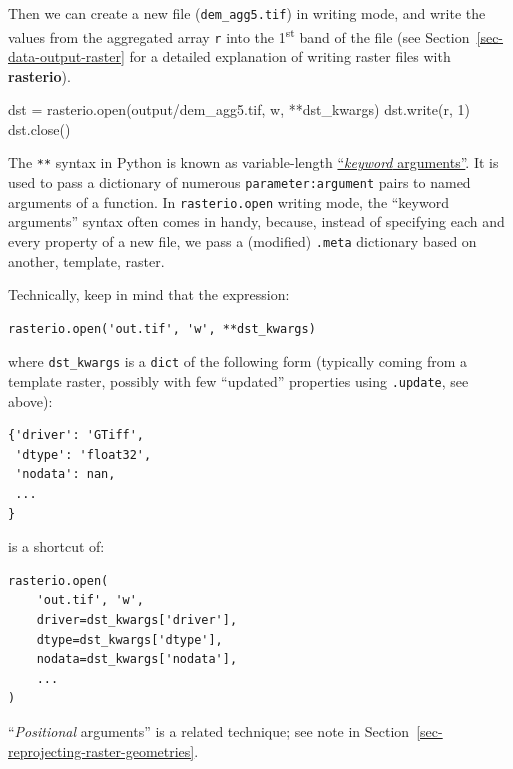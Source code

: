 \documentclass[
  letterpaper,
]{krantz}
\newenvironment{Shaded}{\begin{snugshade}}{\end{snugshade}}
\newcommand{\BuiltInTok}[1]{\textcolor[rgb]{0.00,0.23,0.31}{#1}}
\newcommand{\DecValTok}[1]{\textcolor[rgb]{0.68,0.00,0.00}{#1}}
\newcommand{\NormalTok}[1]{\textcolor[rgb]{0.00,0.23,0.31}{#1}}
\newcommand{\OperatorTok}[1]{\textcolor[rgb]{0.37,0.37,0.37}{#1}}
\newcommand{\StringTok}[1]{\textcolor[rgb]{0.13,0.47,0.30}{#1}}
\begin{document}
Then we can create a new file (\texttt{dem\_agg5.tif}) in writing mode,
and write the values from the aggregated array \texttt{r} into the
1\textsuperscript{st} band of the file (see
Section~\ref{sec-data-output-raster} for a detailed explanation of
writing raster files with \textbf{rasterio}).

\begin{Shaded}
\begin{Highlighting}[]
\NormalTok{dst }\OperatorTok{=}\NormalTok{ rasterio.}\BuiltInTok{open}\NormalTok{(}\StringTok{\textquotesingle{}output/dem\_agg5.tif\textquotesingle{}}\NormalTok{, }\StringTok{\textquotesingle{}w\textquotesingle{}}\NormalTok{, }\OperatorTok{**}\NormalTok{dst\_kwargs)}
\NormalTok{dst.write(r, }\DecValTok{1}\NormalTok{)}
\NormalTok{dst.close()}
\end{Highlighting}
\end{Shaded}

\begin{tcolorbox}[enhanced jigsaw, title=\textcolor{quarto-callout-note-color}{\faInfo}\hspace{0.5em}{Note}, arc=.35mm, toprule=.15mm, titlerule=0mm, colframe=quarto-callout-note-color-frame, breakable, toptitle=1mm, bottomtitle=1mm, rightrule=.15mm, colbacktitle=quarto-callout-note-color!10!white, leftrule=.75mm, left=2mm, bottomrule=.15mm, opacityback=0, coltitle=black, opacitybacktitle=0.6, colback=white]

The \texttt{**} syntax in Python is known as variable-length
\href{https://docs.python.org/3/glossary.html\#term-argument}{``\emph{keyword}
arguments''}. It is used to pass a dictionary of numerous
\texttt{parameter:argument} pairs to named arguments of a function. In
\texttt{rasterio.open} writing mode, the ``keyword arguments'' syntax
often comes in handy, because, instead of specifying each and every
property of a new file, we pass a (modified) \texttt{.meta} dictionary
based on another, template, raster.

Technically, keep in mind that the expression:

\begin{verbatim}
rasterio.open('out.tif', 'w', **dst_kwargs)
\end{verbatim}

where \texttt{dst\_kwargs} is a \texttt{dict} of the following form
(typically coming from a template raster, possibly with few ``updated''
properties using \texttt{.update}, see above):

\begin{verbatim}
{'driver': 'GTiff',
 'dtype': 'float32',
 'nodata': nan,
 ...
}
\end{verbatim}

is a shortcut of:

\begin{verbatim}
rasterio.open(
    'out.tif', 'w', 
    driver=dst_kwargs['driver'], 
    dtype=dst_kwargs['dtype'], 
    nodata=dst_kwargs['nodata'], 
    ...
)
\end{verbatim}

``\emph{Positional} arguments'' is a related technique; see note in
Section~\ref{sec-reprojecting-raster-geometries}.

\end{tcolorbox}
\end{document}

